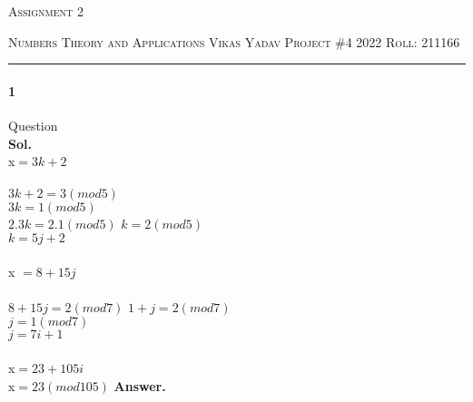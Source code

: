 \documentclass[12pt]{amsart}
\begin{document}
\thispagestyle{empty}
\begin{center}
    {\scshape \large  Assignment 2}
\end{center}
{\scshape Numbers Theory and Applications} \hfill 
\hfill {\scshape Vikas Yadav}
\linebreak
{\scshape Project \#4 2022}  \hfill {\scshape Roll: 211166}
\smallskip
\hrule
\bigskip

\paragraph*{1} Question
\bigskip \\
\textbf{Sol.}
\\
x$=3k + 2$  \in  {}   \\
\\
$3k + 2= 3(mod 5)$   \\
 $3k = 1(mod 5)$\\ 
$2.3k= 2.1(mod 5)$ \iff $k= 2(mod 5)$\\
\implies $k= 5j +2$   \in  {}   \\
\\
x $= 8 + 15j$   \in  {}   \\
\\
$8 + 15j = 2(mod 7)$ \iff  $1 + j = 2(mod 7)$\\
\implies $ j = 1(mod 7)$\\
\implies $ j = 7i + 1$  \in  {}  \\
\\
x$ = 23 + 105i $  \in  {}\\
\implies x$= 23(mod 105)$
\textbf{ Answer.}
\bigskip

\end{document}

